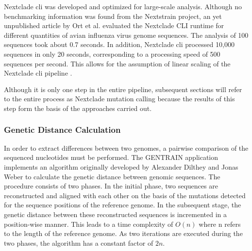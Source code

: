 Nextclade \acrshort{cli} was developed and optimized for large-scale analysis. \cite{Nex1} Although no benchmarking information was found from the Nextstrain project, an yet unpublished article by Ort et al. evaluated the Nextclade CLI runtime for different quantities of avian influenza virus genome sequences. The analysis of 100 sequences took about 0.7 seconds. In addition, Nextclade \acrshort{cli} processed 10,000 sequences in only 20 seconds, corresponding to a processing speed of 500 sequences per second. This allows for the assumption of linear scaling of the Nextclade \acrshort{cli} pipeline \cite{Ort1}.

Although it is only one step in the entire pipeline, subsequent sections will refer to the entire process as Nextclade mutation calling because the results of this step form the basis of the approaches carried out.

\subsubsection{Genetic Distance Calculation}
\label{sec:calculation_of_genetic_distances}
In order to extract differences between two genomes, a pairwise comparison of the sequenced nucleotides must be performed. The GENTRAIN application implements an algorithm originally developed by Alexander Dilthey and Jonas Weber to calculate the genetic distance between genomic sequences. The procedure consists of two phases. In the initial phase, two sequences are reconstructed and aligned with each other on the basis of the mutations detected for the sequence positions of the reference genome. In the subsequent stage, the genetic distance between these reconstructed sequences is incremented in a position-wise manner. This leads to a time complexity of $O(n)$ where n refers to the length of the reference genome. As two iterations are executed during the two phases, the algorithm has a constant factor of $2n$.

